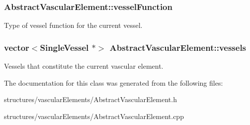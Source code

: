 \subsubsection[{\texorpdfstring{vessel\+Function}{vesselFunction}}]{ Abstract\+Vascular\+Element\+::vessel\+Function}\hypertarget{class_abstract_vascular_element_a4d207777a63223377e3a8b69c50c2a08}{}\label{class_abstract_vascular_element_a4d207777a63223377e3a8b69c50c2a08}
Type of vessel function for the current vessel. 
\subsubsection[{\texorpdfstring{vessels}{vessels}}]{\setlength{\rightskip}{0pt plus 5cm}vector$<${\bf Single\+Vessel} $\ast$$>$ Abstract\+Vascular\+Element\+::vessels\hspace{0.3cm}{\ttfamily [protected]}}\hypertarget{class_abstract_vascular_element_ace778eb36210480ccfbaadfcd8c4802b}{}\label{class_abstract_vascular_element_ace778eb36210480ccfbaadfcd8c4802b}
Vessels that constitute the current vascular element. 

The documentation for this class was generated from the following files\+:\begin{DoxyCompactItemize}
\item 
structures/vascular\+Elements/Abstract\+Vascular\+Element.\+h\item 
structures/vascular\+Elements/Abstract\+Vascular\+Element.\+cpp\end{DoxyCompactItemize}
